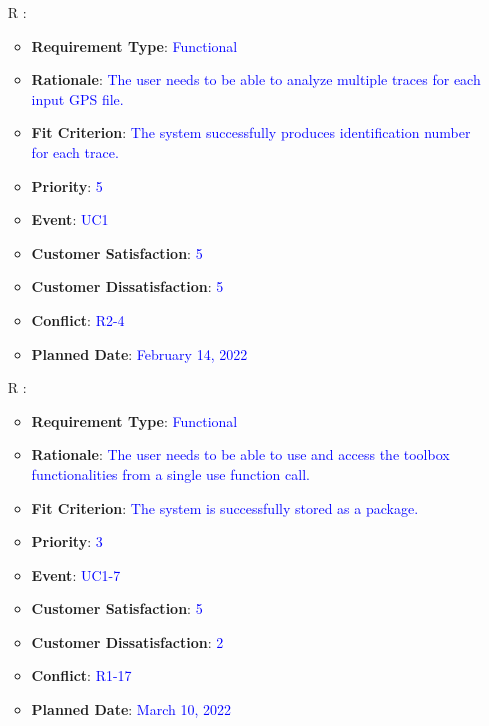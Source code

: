 \documentclass[12pt, titlepage]{article}
\newcounter{reqnum} %
\begin{document}
\begin{itemize}
\item[R\refstepcounter{reqnum}\thereqnum
\label{R_Inputs_1}:] 
\begin{itemize}
    \item \textbf{Requirement Type}: \textcolor{blue}{Functional}
    \item \textbf{Rationale}: \textcolor{blue}{The user needs to be able to analyze multiple traces for each input GPS file.}
    \item \textbf{Fit Criterion}: \textcolor{blue}{The system successfully produces identification number for each trace.}
    \item \textbf{Priority}: \textcolor{blue}{5}
    \item \textbf{Event}: \textcolor{blue}{UC1}
    \item \textbf{Customer Satisfaction}: \textcolor{blue}{5}
    \item \textbf{Customer Dissatisfaction}: \textcolor{blue}{5}
    \item \textbf{Conflict}: \textcolor{blue}{R2-4}
    \item \textbf{Planned Date}: \textcolor{blue}{February 14, 2022}
\end{itemize}

\item[R\refstepcounter{reqnum}\thereqnum
\label{R_Inputs_1}:] 
\begin{itemize}
    \item \textbf{Requirement Type}: \textcolor{blue}{Functional}
    \item \textbf{Rationale}: \textcolor{blue}{The user needs to be able to use and access the toolbox functionalities from a single use function call.}
    \item \textbf{Fit Criterion}: \textcolor{blue}{The system is successfully stored as a package.}
    \item \textbf{Priority}: \textcolor{blue}{3}
    \item \textbf{Event}: \textcolor{blue}{UC1-7}
    \item \textbf{Customer Satisfaction}: \textcolor{blue}{5}
    \item \textbf{Customer Dissatisfaction}: \textcolor{blue}{2}
    \item \textbf{Conflict}: \textcolor{blue}{R1-17}
    \item \textbf{Planned Date}: \textcolor{blue}{March 10, 2022}
\end{itemize}

\end{itemize}
\end{document}
